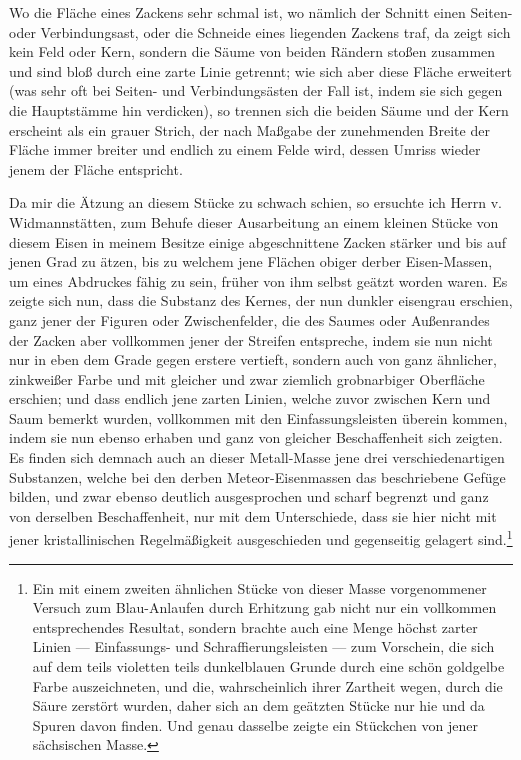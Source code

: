 \documentclass[a4paper, 11pt, oneside, german]{article}
\begin{document}
Wo die Fläche eines Zackens sehr schmal ist, wo nämlich der Schnitt einen Seiten- oder Verbindungsast, oder die Schneide eines liegenden Zackens traf, da zeigt sich kein Feld oder Kern, sondern die Säume von beiden Rändern stoßen zusammen und sind bloß durch eine zarte Linie getrennt; wie sich aber diese Fläche erweitert (was sehr oft bei Seiten- und Verbindungsästen der Fall ist, indem sie sich gegen die Hauptstämme hin verdicken), so trennen sich die beiden Säume und der Kern erscheint als ein grauer Strich, der nach Maßgabe der zunehmenden Breite der Fläche immer breiter und endlich zu einem Felde wird, dessen Umriss wieder jenem der Fläche entspricht.

Da mir die Ätzung an diesem Stücke zu schwach schien, so ersuchte ich Herrn v. Widmannstätten, zum Behufe dieser Ausarbeitung an einem kleinen Stücke von diesem Eisen in meinem Besitze einige abgeschnittene Zacken stärker und bis auf jenen Grad zu ätzen, bis zu welchem jene Flächen obiger derber Eisen-Massen, um eines Abdruckes fähig zu sein, früher von ihm selbst geätzt worden waren. Es zeigte sich nun, dass die Substanz des Kernes, der nun dunkler eisengrau erschien, ganz jener der Figuren oder Zwischenfelder, die des Saumes oder Außenrandes der Zacken aber vollkommen jener der Streifen entspreche, indem sie nun nicht nur in eben dem Grade gegen erstere vertieft, sondern auch von ganz ähnlicher, zinkweißer Farbe und mit gleicher und zwar ziemlich grobnarbiger Oberfläche erschien; und dass endlich jene zarten Linien, welche zuvor zwischen Kern und Saum bemerkt wurden, vollkommen mit den Einfassungsleisten überein kommen, indem sie nun ebenso erhaben und ganz von gleicher Beschaffenheit sich zeigten. Es finden sich demnach auch an dieser Metall-Masse jene drei verschiedenartigen Substanzen, welche bei den derben Meteor-Eisenmassen das beschriebene Gefüge bilden, und zwar ebenso deutlich ausgesprochen und scharf begrenzt und ganz von derselben Beschaffenheit, nur mit dem Unterschiede, dass sie hier nicht mit jener kristallinischen Regelmäßigkeit ausgeschieden und gegenseitig gelagert sind.\footnote{Ein mit einem zweiten ähnlichen Stücke von dieser Masse vorgenommener Versuch zum Blau-Anlaufen durch Erhitzung gab nicht nur ein vollkommen entsprechendes Resultat, sondern brachte auch eine Menge höchst zarter Linien --- Einfassungs- und Schraffierungsleisten --- zum Vorschein, die sich auf dem teils violetten teils dunkelblauen Grunde durch eine schön goldgelbe Farbe auszeichneten, und die, wahrscheinlich ihrer Zartheit wegen, durch die Säure zerstört wurden, daher sich an dem geätzten Stücke nur hie und da Spuren davon finden. Und genau dasselbe zeigte ein Stückchen von jener sächsischen Masse.}
\end{document}
